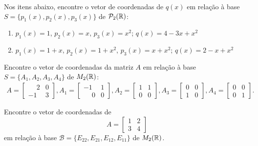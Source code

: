 \documentclass[12pt]{exam}
\begin{document}
    \begin{exercicio}
        Nos itens abaixo, encontre o vetor de coordenadas de $q(x)$ em relação à base $S = \{p_1(x), p_2(x), p_3(x)\}$ de $\mathcal{P}_2(\mathbb{R})$:
        \begin{enumerate}
            \item $p_1(x) = 1$, $p_2(x) = x$, $p_3(x) = x^2$; $q(x) = 4 - 3x + x^2$
            \item $p_1(x) = 1 + x$, $p_2(x) = 1 + x^2$, $p_3(x) = x + x^2$; $q(x) = 2 - x + x^2$
        \end{enumerate}
    \end{exercicio}

    \begin{exercicio}
        Encontre o vetor de coordenadas da matriz $A$ em relação à base $S = \{A_1, A_2, A_3, A_4\}$ de $M_2(\mathbb{R})$:
        \begin{align*}
            A = \begin{bmatrix}
                \phantom{-} 2 & 0\\
                -1 & 3
            \end{bmatrix},
            A_1 = \begin{bmatrix}
                -1 & 1\\
                \phantom{-} 0 & 0
            \end{bmatrix},
            A_2 = \begin{bmatrix}
                1 & 1\\
                0 & 0
            \end{bmatrix},
            A_3 = \begin{bmatrix}
                0 & 0\\
                1 & 0
            \end{bmatrix},
            A_4 = \begin{bmatrix}
                0 & 0\\
                0 & 1
            \end{bmatrix}.
        \end{align*}
    \end{exercicio}


    \begin{exercicio}
        Encontre o vetor de coordenadas de
        \[
            A = \begin{bmatrix}
                1 & 2\\
                3 & 4
            \end{bmatrix}
        \]
        em relação à base $\mathcal{B} = \{E_{22}, E_{21}, E_{12}, E_{11}\}$ de $M_2(\mathbb{R})$.
    \end{exercicio}
\end{document}
